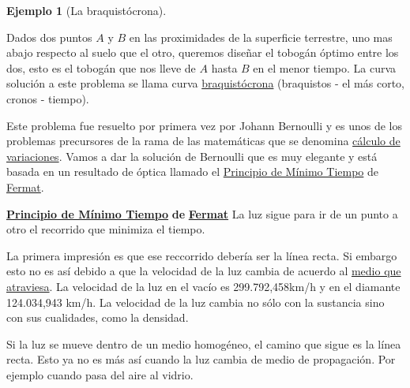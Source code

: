 \documentclass{article}
\newtheorem{ejemplo}{Ejemplo}}
\begin{document}
\begin{ejemplo}[La braquistócrona]

\end{ejemplo}


\begin{problema} Dados dos puntos $A$ y $B$ en las proximidades de la superficie terrestre, uno mas abajo respecto al suelo que el otro,
queremos diseñar el tobogán óptimo entre los dos,
esto es el tobogán que nos lleve de $A$ hasta $B$ en el menor tiempo. La curva solución a este problema se llama curva 
\href{http://es.wikipedia.org/wiki/Curva_braquistócrona}{braquistócrona} (braquistos - el más corto, cronos - tiempo). 
\end{problema}


\begin{center}
\end{center}


 Este problema fue resuelto por primera vez por Johann Bernoulli y es unos de los problemas precursores de la rama de las matemáticas que se denomina
\href{http://es.wikipedia.org/wiki/Cálculo_variacional}{cálculo de 
variaciones}. Vamos a dar la solución de Bernoulli que es muy elegante y está basada en un resultado de óptica llamado 
 el \href{http://es.wikipedia.org/wiki/Principio_de_Fermat}{Principio de Mínimo Tiempo} de \href{http://es.wikipedia.org/wiki/Fermat}{Fermat}.

\begin{boite}[boxcolor=orange, background=blue!5, titlebackground=blue!20,
titleboxcolor = black]{\href{http://es.wikipedia.org/wiki/Principio_de_Fermat}{\textbf {Principio de Mínimo Tiempo}} \textbf{de} \href{http://es.wikipedia.org/wiki/Fermat}{\textbf{Fermat}}}
 La luz sigue para ir de un punto a otro el recorrido que minimiza el tiempo.
\end{boite}



 La primera impresión   es que ese reccorrido debería ser la línea recta. Si embargo esto no es así debido a que la velocidad de la luz cambia
de acuerdo al \href{http://es.wikipedia.org/wiki/Velocidad_de_la_luz_en_un_medio_material}{medio que atraviesa}. 
La velocidad de la luz en el vacío es 299.792,458km/h y en el diamante 124.034,943 km/h. La velocidad de la luz cambia no sólo con la sustancia sino con sus cualidades, 
como la densidad. 

 Si la luz se mueve dentro de un medio homogéneo, el camino que sigue es la línea recta. Esto ya no es más así cuando la luz cambia de medio de propagación. Por ejemplo
cuando pasa del aire al vidrio. 
\end{document}
